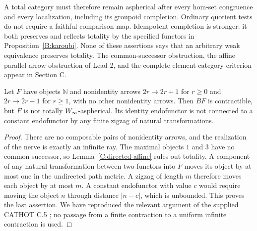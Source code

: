 \begin{remark}\label{B:scope-tests}
A total category must therefore remain aspherical after every hom-set congruence and every localization, including its groupoid completion. Ordinary quotient tests do not require a faithful comparison map. Idempotent completion is stronger: it both preserves and reflects totality by the specified functors in Proposition~\ref{B:karoubi}. None of these assertions says that an arbitrary weak equivalence preserves totality. The common-successor obstruction, the affine parallel-arrow obstruction of Lead 2, and the complete element-category criterion appear in Section C.
\end{remark}

\begin{example}\label{B:fence}
Let $F$ have objects $\mathbb N$ and nonidentity arrows $2r\to2r+1$ for $r\geq0$ and $2r\to2r-1$ for $r\geq1$, with no other nonidentity arrows. Then $BF$ is contractible, but $F$ is not totally $W_{\infty}$-aspherical. Its identity endofunctor is not connected to a constant endofunctor by any finite zigzag of natural transformations.
\end{example}
\begin{proof}
There are no composable pairs of nonidentity arrows, and the realization of the nerve is exactly an infinite ray. The maximal objects $1$ and $3$ have no common successor, so Lemma~\ref{C:directed-affine} rules out totality. A component of any natural transformation between two functors into $F$ moves its object by at most one in the undirected path metric. A zigzag of length $m$ therefore moves each object by at most $m$. A constant endofunctor with value $c$ would require moving the object $n$ through distance $|n-c|$, which is unbounded. This proves the last assertion. We have reproduced the relevant argument of the supplied CATHOT C.5 \citep{CATHOTDraft2026}; no passage from a finite contraction to a uniform infinite contraction is used.
\end{proof}


